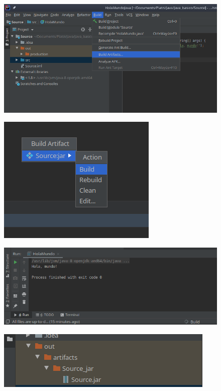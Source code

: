 \documentclass{article}
\begin{document}
\begin{figure}[h!]
  \centering
  \includegraphics[scale=0.65]{./Pictures/010_jar.png}
\end{figure}

\begin{figure}[h!]
  \centering
  \includegraphics[scale=0.65]{./Pictures/011_jar.png}
\end{figure}

\begin{figure}[h!]
  \centering
  \includegraphics[scale=0.75]{./Pictures/012_jar.png}
\end{figure}

\newpage

\begin{figure}[h!]
  \centering
  \includegraphics[scale=0.75]{./Pictures/013_jar.png}
\end{figure}
\end{document}
